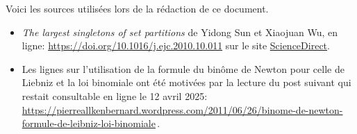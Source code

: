 Voici les sources utilisées lors de la rédaction de ce document.
%
\begin{itemize}[wide]
	\item \emph{\og The largest singletons of set partitions \fg}
de Yidong Sun et Xiaojuan Wu, en ligne:
	\url{https://doi.org/10.1016/j.ejc.2010.10.011}
	sur le site \href{https://www.sciencedirect.com/}{ScienceDirect}.

	\item Les lignes sur l'utilisation de la formule du binôme de Newton pour celle de Liebniz et la loi binomiale ont été motivées par la lecture du post suivant qui restait consultable en ligne le 12 avril 2025:
	\url{https://pierreallkenbernard.wordpress.com/2011/06/26/binome-de-newton-formule-de-leibniz-loi-binomiale}\,.
\end{itemize}